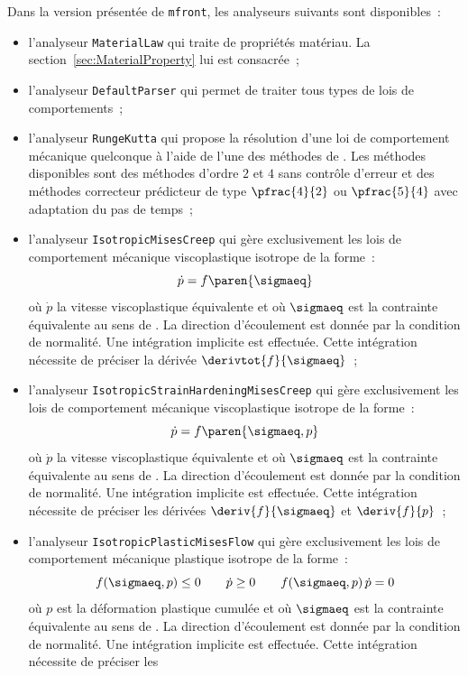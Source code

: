 \documentclass[rectoverso,pleiades,pstricks,leqno,anti]{texmf/note_technique_2010}
\newcommand{\mfront}{\texttt{mfront}}
\begin{document}
Dans la version présentée de \mfront{}, les analyseurs suivants sont
disponibles~:
\begin{itemize}
  \item l'analyseur {\tt Material\-Law} qui traite de propriétés
  matériau. La section~\ref{sec:MaterialProperty} lui est consacrée~;
  \item l'analyseur \texttt{DefaultParser} qui permet de traiter tous
  types de lois de comportements~;
  \item l'analyseur \texttt{RungeKutta} qui propose la résolution d'une
  loi de comportement mécanique quelconque à l'aide de l'une des
  méthodes de . Les méthodes disponibles sont des
  méthodes d'ordre \(2\) et \(4\) sans contrôle d'erreur et des méthodes
  correcteur prédicteur de type \(\pfrac{4}{2}\) ou \(\pfrac{5}{4}\)
  avec adaptation du pas de temps~;
  \item l'analyseur \texttt{IsotropicMisesCreep} qui gère exclusivement
  les lois de comportement mécanique viscoplastique isotrope de la
  forme~:
  \[
  \dot{p} = f\paren{\sigmaeq}
  \]
  où \(\dot{p}\) la vitesse viscoplastique équivalente et où
  \(\sigmaeq\) est la contrainte équivalente au sens de .
  La direction d'écoulement est donnée par la condition de normalité.
  Une intégration implicite est effectuée. Cette intégration nécessite
  de préciser la dérivée \(\derivtot{f}{\sigmaeq}\)~;
  \item l'analyseur \texttt{IsotropicStrainHardeningMisesCreep} qui gère
  exclusivement les lois de comportement mécanique viscoplastique
  isotrope de la forme~:
  \[
  \dot{p} = f\paren{\sigmaeq,p}
  \]
  où \(\dot{p}\) la vitesse viscoplastique équivalente et où
  \(\sigmaeq\) est la contrainte équivalente au sens de .
  La direction d'écoulement est donnée par la condition de normalité.
  Une intégration implicite est effectuée. Cette intégration nécessite
  de préciser les dérivées \(\deriv{f}{\sigmaeq}\) et \(\deriv{f}{p}\)~;
  \item l'analyseur \texttt{IsotropicPlasticMisesFlow} qui gère
  exclusivement les lois de comportement mécanique plastique isotrope de
  la forme~:
  \[
  f(\sigmaeq,p)\leq 0 \quad\quad \dot{p}\geq 0 \quad\quad
  f(\sigmaeq,p)\,\dot{p} = 0
  \]
  où \(p\) est la déformation plastique cumulée et où \(\sigmaeq\) est
  la contrainte équivalente au sens de . La direction
  d'écoulement est donnée par la condition de normalité. Une intégration
  implicite est effectuée. Cette intégration nécessite de préciser les

\end{itemize}
\end{document}

